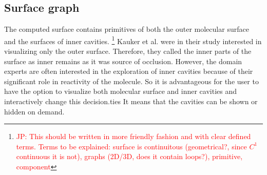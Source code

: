 \subsection{Surface graph}
\label{sec:graph}
   

The computed surface contains primitives of both the outer molecular surface and the surfaces of inner cavities.
\footnote{\textcolor{red}{JP: This should be written in more friendly fashion and with clear defined terms.
Terms to be explained: surface is continuitous (geometrical?, since $C^1$ continuous it is not), graphs (2D/3D, does it contain loops?), primitive, component}}
Kauker et al. \cite{kauker2013rendering} were in their study interested in visualizing only the outer surface.
Therefore, they called the inner parts of the surface as inner remains as it was source of occlusion.
However, the domain experts are often interested in the exploration of inner cavities because of their significant role in reactivity of the molecule.
So it is advantageous for the user to have the option to visualize both molecular surface and inner cavities and interactively change this decision.ties
It means that the cavities can be shown or hidden on demand.

